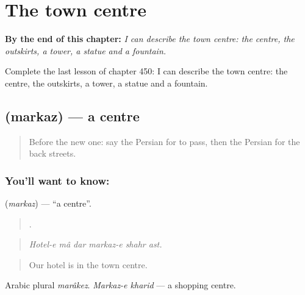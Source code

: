 
\chapter{The town centre}
\label{ch:fa-the-town-centre}

\begin{chapteropening}
\textbf{By the end of this chapter:} \emph{I can describe the town centre: the centre, the outskirts, a tower, a statue and a fountain.}

Complete the last lesson of chapter 450: I can describe the town centre: the centre, the outskirts, a tower, a statue and a fountain.
\end{chapteropening}

\section[\texorpdfstring{\fa{مرکز} (markaz)}{مرکز (markaz)}]{ (markaz) — a centre}

\label{lesson:FA-C450-markaz}



\begin{quote}
Before the new one: say the Persian for to pass, then the Persian for the back streets.
\end{quote}

\subsection*{You'll want to know: }
\textbf{} (\emph{markaz}) — \textquotedblleft{}a centre\textquotedblright{}.

\begin{quote}
     .
\end{quote}

\begin{quote}
\emph{Hotel-e mâ dar markaz-e shahr ast.}
\end{quote}

\begin{quote}
Our hotel is in the town centre.
\end{quote}

Arabic plural \emph{marâkez}. \emph{Markaz-e kharid} — a shopping centre.

